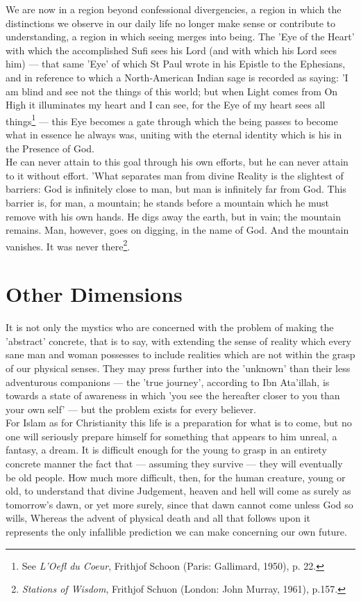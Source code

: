 \documentclass[11pt, b5paper, twoside]{book}
\begin{document}
We are now in a region beyond confessional divergencies, a region in which the distinctions we 
observe in our daily life no longer make sense or contribute to understanding, a region in which 
seeing merges into being. The 'Eye of the Heart' with which the accomplished Sufi sees his Lord (and 
with which his Lord sees him) --- that same 'Eye' of which St Paul wrote in his Epistle to the 
Ephesians, and in reference to which a North-American Indian sage is recorded as saying: 'I am blind 
and see not the things of this world; but when Light comes from On High it illuminates my heart and I 
can see, for the Eye of my heart sees all things\footnote{See \emph{L'Oefl du Coeur}, Frithjof Schoon (Paris: Gallimard, 1950), p. 22.} --- this Eye becomes a gate through which the 
being passes to become what in essence he always was, uniting with the eternal identity which is his 
in the Presence of God. \\

He can never attain to this goal through his own efforts, but he can never attain to it without 
effort. 'What separates man from divine Reality is the slightest of barriers: God is infinitely close 
to man, but man is infinitely far from God. This barrier is, for man, a mountain; he stands before a 
mountain which he must remove with his own hands. He digs away the earth, but in vain; the mountain 
remains. Man, however, goes on digging, in the name of God. And the mountain vanishes. It was never 
there\footnote{\emph{Stations of Wisdom}, Frithjof Schuon (London: John Murray, 1961), p.157.}. \\


\chapter{Other Dimensions}

It is not only the mystics who are concerned with the problem of making the 'abstract' concrete, that 
is to say, with extending the sense of reality which every sane man and woman possesses to include 
realities which are not within the grasp of our physical senses. They may press further into the 
'unknown' than their less adventurous companions --- the 'true journey', according to Ibn Ata'illah, is 
towards a state of awareness in which 'you see the hereafter closer to you than your own self' --- but 
the problem exists for every believer. \\

For Islam as for Christianity this life is a preparation for what is to come, but no one will 
seriously prepare himself for something that appears to him unreal, a fantasy, a dream. It is 
difficult enough for the young to grasp in an entirety concrete manner the fact that --- assuming they 
survive --- they will eventually be old people. How much more difficult, then, for the human creature, 
young or old, to understand that divine Judgement, heaven and hell will come as surely as tomorrow's 
dawn, or yet more surely, since that dawn cannot come unless God so wills, Whereas the advent of 
physical death and all that follows upon it represents the only infallible prediction we can make 
concerning our own future. \\
\end{document}
